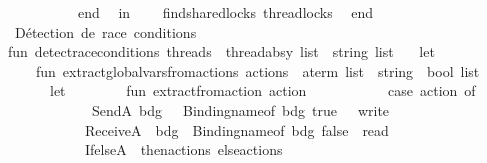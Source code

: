 \begin{isabellebody}
\ \ \ \ \ \ \ \ \ \ end\isanewline
\ \ in\isanewline
\ \ \ \ find{\isacharunderscore}{\kern0pt}shared{\isacharunderscore}{\kern0pt}locks\ thread{\isacharunderscore}{\kern0pt}locks\isanewline
\ \ end\isanewline
\isanewline
{\isacharparenleft}{\kern0pt}{\isacharasterisk}{\kern0pt}\ Détection\ de\ race\ conditions\ {\isacharasterisk}{\kern0pt}{\isacharparenright}{\kern0pt}\isanewline
fun\ detect{\isacharunderscore}{\kern0pt}race{\isacharunderscore}{\kern0pt}conditions\ {\isacharparenleft}{\kern0pt}threads\ {\isacharcolon}{\kern0pt}\ thread{\isacharunderscore}{\kern0pt}absy\ list{\isacharparenright}{\kern0pt}\ {\isacharcolon}{\kern0pt}\ string\ list\ {\isacharequal}{\kern0pt}\isanewline
\ \ let\isanewline
\ \ \ \ fun\ extract{\isacharunderscore}{\kern0pt}global{\isacharunderscore}{\kern0pt}vars{\isacharunderscore}{\kern0pt}from{\isacharunderscore}{\kern0pt}actions\ {\isacharparenleft}{\kern0pt}actions\ {\isacharcolon}{\kern0pt}\ a{\isacharunderscore}{\kern0pt}term\ list{\isacharparenright}{\kern0pt}\ {\isacharcolon}{\kern0pt}\ {\isacharparenleft}{\kern0pt}string\ {\isacharasterisk}{\kern0pt}\ bool{\isacharparenright}{\kern0pt}\ list\ {\isacharequal}{\kern0pt}\isanewline
\ \ \ \ \ \ let\isanewline
\ \ \ \ \ \ \ \ fun\ extract{\isacharunderscore}{\kern0pt}from{\isacharunderscore}{\kern0pt}action\ action\ {\isacharequal}{\kern0pt}\isanewline
\ \ \ \ \ \ \ \ \ \ case\ action\ of\isanewline
\ \ \ \ \ \ \ \ \ \ \ \ SendA\ {\isacharparenleft}{\kern0pt}bdg{\isacharcomma}{\kern0pt}\ {\isacharunderscore}{\kern0pt}{\isacharparenright}{\kern0pt}\ {\isacharequal}{\kern0pt}{\isachargreater}{\kern0pt}\ {\isacharbrackleft}{\kern0pt}{\isacharparenleft}{\kern0pt}Binding{\isachardot}{\kern0pt}name{\isacharunderscore}{\kern0pt}of\ bdg{\isacharcomma}{\kern0pt}\ true{\isacharparenright}{\kern0pt}{\isacharbrackright}{\kern0pt}\ \ {\isacharparenleft}{\kern0pt}{\isacharasterisk}{\kern0pt}\ write\ {\isacharasterisk}{\kern0pt}{\isacharparenright}{\kern0pt}\isanewline
\ \ \ \ \ \ \ \ \ \ {\isacharbar}{\kern0pt}\ ReceiveA\ {\isacharparenleft}{\kern0pt}{\isacharunderscore}{\kern0pt}{\isacharcomma}{\kern0pt}\ bdg{\isacharparenright}{\kern0pt}\ {\isacharequal}{\kern0pt}{\isachargreater}{\kern0pt}\ {\isacharbrackleft}{\kern0pt}{\isacharparenleft}{\kern0pt}Binding{\isachardot}{\kern0pt}name{\isacharunderscore}{\kern0pt}of\ bdg{\isacharcomma}{\kern0pt}\ false{\isacharparenright}{\kern0pt}{\isacharbrackright}{\kern0pt}\ {\isacharparenleft}{\kern0pt}{\isacharasterisk}{\kern0pt}\ read\ {\isacharasterisk}{\kern0pt}{\isacharparenright}{\kern0pt}\isanewline
\ \ \ \ \ \ \ \ \ \ {\isacharbar}{\kern0pt}\ IfelseA\ {\isacharparenleft}{\kern0pt}{\isacharparenleft}{\kern0pt}{\isacharunderscore}{\kern0pt}{\isacharcomma}{\kern0pt}\ then{\isacharunderscore}{\kern0pt}actions{\isacharparenright}{\kern0pt}{\isacharcomma}{\kern0pt}\ else{\isacharunderscore}{\kern0pt}actions{\isacharparenright}{\kern0pt}\ {\isacharequal}{\kern0pt}{\isachargreater}{\kern0pt}\isanewline

\end{isabellebody}
